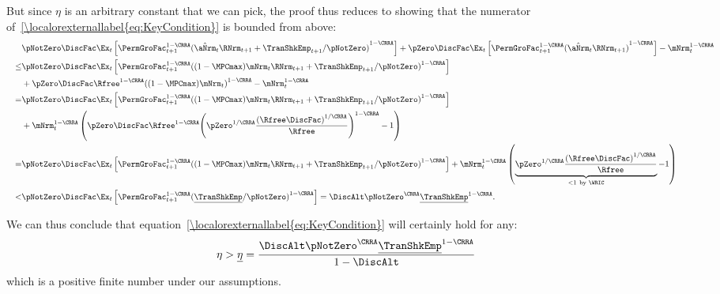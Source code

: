 \documentclass[\econtexRoot/BufferStockTheory]{subfiles}
\begin{document}
But since $\eta$ is an arbitrary constant that we can pick, the proof thus reduces to showing that the numerator of~\eqref{\localorexternallabel{eq:KeyCondition}} is bounded from above:
\begin{equation}\begin{gathered}\begin{aligned}%
      \lefteqn{\pNotZero\DiscFac\Ex_{t}\left[{\PermGroFac}_{t+1}^{1-\CRRA}{(\hat{\aNrm}_{t}\RNrm_{t+1}+\TranShkEmp_{t+1}/\pNotZero)}^{1-\CRRA}\right]
        +\pZero\DiscFac\Ex_{t}\left[{\PermGroFac}_{t+1}^{1-\CRRA}{(\hat{\aNrm}_{t}\RNrm_{t+1})}^{1-\CRRA}\right]-\mNrm_{t}^{1-\CRRA}\notag~~~}  \\ 
      ~~~\leq & \pNotZero\DiscFac\Ex_{t}\left[{\PermGroFac}_{t+1}^{1-\CRRA}{((1-\MPCmax)\mNrm_{t}\RNrm_{t+1}+\TranShkEmp_{t+1}/\pNotZero)}^{1-\CRRA}\right]
      \\ & +\pZero\DiscFac\Rfree^{1-\CRRA}{((1-\MPCmax)\mNrm_{t})}^{1-\CRRA}-\mNrm_{t}^{1-\CRRA}\notag\\
      ~~~= & \pNotZero\DiscFac\Ex_{t}\left[{\PermGroFac}_{t+1}^{1-\CRRA}{((1-\MPCmax)\mNrm_{t}\RNrm_{t+1}+\TranShkEmp_{t+1}/\pNotZero)}^{1-\CRRA}\right]
      \\ & +\mNrm_{t}^{1-\CRRA}\left(\pZero\DiscFac\Rfree^{1-\CRRA}{\left(\pZero^{1/\CRRA}\frac{{(\Rfree\DiscFac)}^{1/\CRRA}}{\Rfree}\right)}^{1-\CRRA}-1\right)\notag\\
      ~~~ =  & \pNotZero\DiscFac\Ex_{t}\left[{\PermGroFac}_{t+1}^{1-\CRRA}{((1-\MPCmax)\mNrm_{t}\RNrm_{t+1}+\TranShkEmp_{t+1}/\pNotZero)}^{1-\CRRA}\right]
      +\mNrm_{t}^{1-\CRRA}\left(\underbrace{\pZero^{1/\CRRA}\frac{{(\Rfree\DiscFac)}^{1/\CRRA}}{\Rfree}}_{<1~\text{by
            \WRIC}}-1\right) \label{eq:WRICBites} \\
      ~~~< &\pNotZero\DiscFac\Ex_{t}\left[{\PermGroFac}_{t+1}^{1-\CRRA}{(\underline{\TranShkEmp}/\pNotZero)}^{1-\CRRA}\right]=\DiscAlt\pNotZero^{\CRRA}\underline{\TranShkEmp}^{1-\CRRA} \notag
      .
    \end{aligned}\end{gathered}\end{equation}

We can thus conclude that equation~\eqref{\localorexternallabel{eq:KeyCondition}} will certainly hold for any:
\begin{equation}\begin{gathered}\begin{aligned}
      \eta>\underline{\eta}=\frac{\DiscAlt\pNotZero^{\CRRA}\underline{\TranShkEmp}^{1-\CRRA}}{1-\DiscAlt}
    \end{aligned}\end{gathered}\end{equation}
which is a positive finite number under our assumptions.
\end{document}
